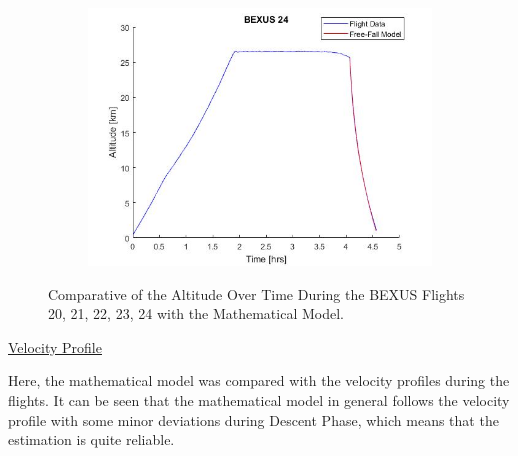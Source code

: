\documentclass[a4paper,12pt,oneside]{article}
\begin{document}
\begin{appendices}
\begin{figure}[H]
\begin{subfigure}{0.45\textwidth}
    \centering\includegraphics[width=1.1\textwidth]{appendix/img/bexus24mathmodel.png}
  \end{subfigure}
  \caption{Comparative of the Altitude Over Time During the BEXUS Flights 20, 21, 22, 23, 24 with the Mathematical Model.}\label{fig:bexustrajectories}
  \end{figure}

 
 
\bigskip
\underline{Velocity Profile}

\smallskip
Here, the mathematical model was compared with the velocity profiles during the flights. It can be seen that the mathematical model in general follows the velocity profile with some minor deviations during Descent Phase, which means that the estimation is quite reliable.


\end{appendices}
\end{document}
